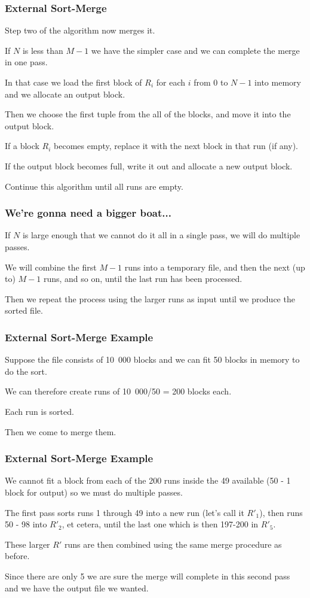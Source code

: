 \begin{frame}
\frametitle{External Sort-Merge}
Step two of the algorithm now merges it. 

If $N$ is less than $M-1$ we have the simpler case and we can complete the merge in one pass. 

In that case we load the first block of $R_{i}$ for each $i$ from $0$ to $N-1$ into memory and we allocate an output block. 

Then we choose the first tuple from the all of the blocks, and move it into the output block. 

If a block $R_{i}$ becomes empty, replace it with the next block in that run (if any).

 If the output block becomes full, write it out and allocate a new output block. 
 
 Continue this algorithm until all runs are empty. 

\end{frame}


\begin{frame}
\frametitle{We're gonna need a bigger boat...}

If $N$ is large enough that we cannot do it all in a single pass, we will do multiple passes. 

We will combine the first $M-1$ runs into a temporary file, and then the next (up to) $M-1$ runs, and so on, until the last run has been processed. 

Then we repeat the process using the larger runs as input until we produce the sorted file.

\end{frame}

\begin{frame}
\frametitle{External Sort-Merge Example}


Suppose the file consists of 10~000 blocks and we can fit 50 blocks in memory to do the sort. 

We can therefore create runs of 10~000/50 = 200 blocks each. 

Each run is sorted. 

Then we come to merge them. 

\end{frame}


\begin{frame}
\frametitle{External Sort-Merge Example}
We cannot fit a block from each of the 200 runs inside the 49 available (50 - 1 block for output) so we must do multiple passes. 

The first pass sorts runs 1 through 49 into a new run (let's call it $R'_{1}$), then runs 50 - 98 into $R'_{2}$, et cetera, until the last one which is then 197-200 in $R'_{5}$. 

These larger $R'$ runs are then combined using the same merge procedure as before. 

Since there are only 5 we are sure the merge will complete in this second pass and we have the output file we wanted.


\end{frame}

